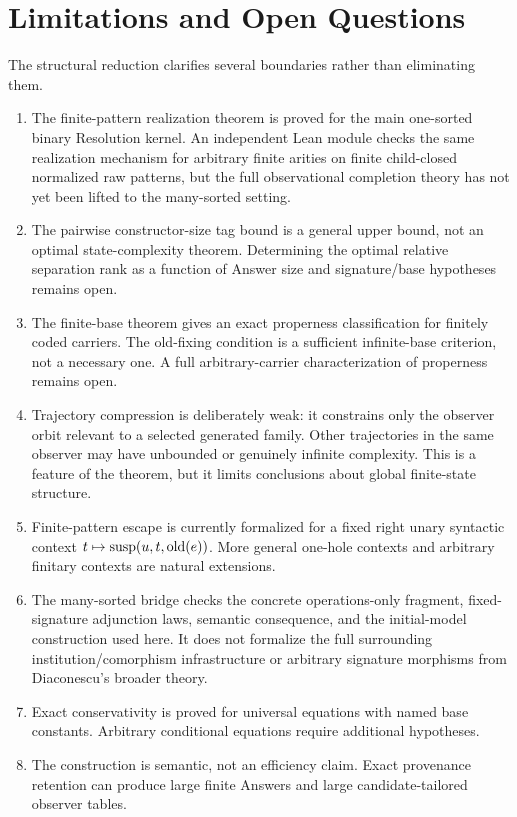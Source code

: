\section{Limitations and Open Questions}\label{sec:limitations}

The structural reduction clarifies several boundaries rather than eliminating
them.

\begin{enumerate}
  \item The finite-pattern realization theorem is proved for the main
        one-sorted binary Resolution kernel.  An independent Lean module checks
        the same realization mechanism for arbitrary finite arities on finite
        child-closed normalized raw patterns, but the full observational
        completion theory has not yet been lifted to the many-sorted setting.
  \item The pairwise constructor-size tag bound is a general upper bound, not
        an optimal state-complexity theorem.  Determining the optimal relative
        separation rank as a function of Answer size and signature/base
        hypotheses remains open.
  \item The finite-base theorem gives an exact properness classification for
        finitely coded carriers.  The old-fixing condition is a sufficient
        infinite-base criterion, not a necessary one.  A full arbitrary-carrier
        characterization of properness remains open.
  \item Trajectory compression is deliberately weak: it constrains only the
        observer orbit relevant to a selected generated family.  Other
        trajectories in the same observer may have unbounded or genuinely
        infinite complexity.  This is a feature of the theorem, but it limits
        conclusions about global finite-state structure.
  \item Finite-pattern escape is currently formalized for a fixed right unary
        syntactic context $t\mapsto\operatorname{susp}(u,t,\operatorname{old}(e))$.  More general one-hole
        contexts and arbitrary finitary contexts are natural extensions.
  \item The many-sorted bridge checks the concrete operations-only fragment,
        fixed-signature adjunction laws, semantic consequence, and the
        initial-model construction used here.  It does not formalize the full
        surrounding institution/comorphism infrastructure or arbitrary
        signature morphisms from Diaconescu's broader theory.
  \item Exact conservativity is proved for universal equations with named base
        constants.  Arbitrary conditional equations require additional
        hypotheses.
  \item The construction is semantic, not an efficiency claim.  Exact
        provenance retention can produce large finite Answers and large
        candidate-tailored observer tables.
\end{enumerate}

